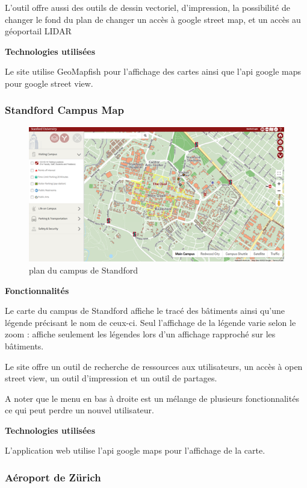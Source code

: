 \documentclass[
    iai, %
    il, %
]{heig-tb}
\begin{document}
L'outil offre aussi des outils de dessin vectoriel, d'impression, la possibilité de changer le fond du plan de changer un accès à google street map, et un accès au géoportail LIDAR

\textbf{Technologies utilisées}

Le site utilise GeoMapfish pour l'affichage des cartes ainsi que l'api google maps pour google street view.

\subsubsection{Standford Campus Map}

\begin{figure}[h]
    \centering
    \includegraphics[scale=0.7]{standfordCampusMap.png}
    \caption{plan du campus de Standford}
\end{figure}

\textbf{Fonctionnalités}

Le carte du campus de Standford \cite{standford-map} affiche le tracé des bâtiments ainsi qu'une légende précisant le nom de ceux-ci.
Seul l'affichage de la légende varie selon le zoom : affiche seulement les légendes lors d'un affichage rapproché sur les bâtiments.

Le site offre un outil de recherche de ressources aux utilisateurs, un accès à open street view, un outil d'impression et un outil de partages.

A noter que le menu en bas à droite est un mélange de plusieurs fonctionnalités ce qui peut perdre un nouvel utilisateur.

\textbf{Technologies utilisées}

L'application web utilise l'api google maps pour l'affichage de la carte.

\subsubsection{Aéroport de Zürich}
\end{document}
